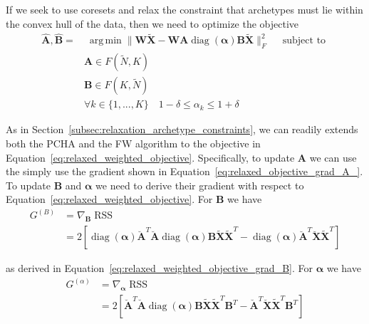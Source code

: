 \documentclass{article}
\DeclareMathOperator*{\argmin}{arg\,min}
\begin{document}
If we seek to use coresets and relax the constraint that archetypes must lie within the convex hull of the data, then we need to optimize the objective
\begin{equation}
\label{eq:relaxed_weighted_objective}
    \begin{aligned}
        \hat{\mathbf{A}}, \hat{\mathbf{B}} =& \; \underset{}{\argmin}
        \| \mathbf{W} \tilde{\mathbf{X}} -  \mathbf{W} {\mathbf{A}} \operatorname{diag}(\boldsymbol{\alpha}) \mathbf{B} \tilde{\mathbf{X}} \|_F^2 \quad \text{ subject to } \\
        & \mathbf{A} \in F(\tilde{N}, K) \\
        & \mathbf{B} \in F(K, \tilde{N}) \\
        & \forall k \in \{1, ..., K\} \quad 1 - \delta \leq \alpha_k \leq 1 + \delta
    \end{aligned}
\end{equation}

As in Section~\ref{subsec:relaxation_archetype_constraints}, we can readily extends both the PCHA and the FW algorithm to the objective in Equation~\ref{eq:relaxed_weighted_objective}. Specifically, to update $\mathbf{A}$ we can use the simply use the gradient shown in Equation~\ref{eq:relaxed_objective_grad_A_}. To update $\mathbf{B}$ and $\boldsymbol{\alpha}$ we need to derive their gradient with respect to Equation~\ref{eq:relaxed_weighted_objective}. For $\mathbf{B}$ we have
\begin{equation}
    \label{eq:relaxed_weighted_objective_grad_B_}
    \begin{aligned}
        G^{(B)}
        &= \nabla_{\mathbf{B}} \operatorname{RSS} \\
        &= 2
        \left[
            \operatorname{diag}(\boldsymbol{\alpha}) \breve{\mathbf{A}}^T \breve{\mathbf{A}} \operatorname{diag}(\boldsymbol{\alpha}) \mathbf{B} \tilde{\mathbf{X}} \tilde{\mathbf{X}}^T
            - \operatorname{diag}(\boldsymbol{\alpha}) \breve{\mathbf{A}}^T \breve{\mathbf{X}} \tilde{\mathbf{X}}^T
        \right]
    \end{aligned}
\end{equation}

as derived in Equation~\ref{eq:relaxed_weighted_objective_grad_B}. For $\boldsymbol{\alpha}$ we have
\begin{equation}
    \label{eq:relaxed_weighted_objective_grad_alpha_}
    \begin{aligned}
        G^{(\alpha)}
        &= \nabla_{\boldsymbol{\alpha}} \operatorname{RSS} \\
        & = 2
        \left[
            \breve{\mathbf{A}}^T \breve{\mathbf{A}} \operatorname{diag}(\boldsymbol{\alpha}) \mathbf{B} \tilde{\mathbf{X}} \tilde{\mathbf{X}}^T \mathbf{B}^T
            - \breve{\mathbf{A}}^T \breve{\mathbf{X}} \tilde{\mathbf{X}}^T \mathbf{B}^T
        \right]
    \end{aligned}
\end{equation}
\end{document}
